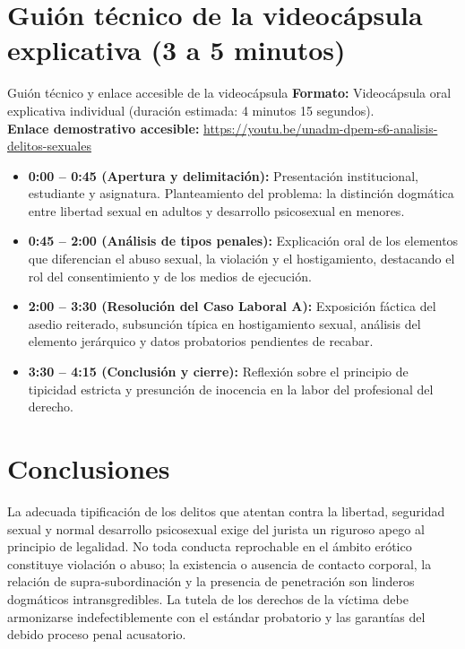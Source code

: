\documentclass[spanish,letterpaper,oneside]{article}
\begin{document}
\section{Guión técnico de la videocápsula explicativa (3 a 5 minutos)}
\begin{casoestudio}{Guión técnico y enlace accesible de la videocápsula}
\textbf{Formato:} Videocápsula oral explicativa individual (duración estimada: 4 minutos 15 segundos). \\
\textbf{Enlace demostrativo accesible:} \url{https://youtu.be/unadm-dpem-s6-analisis-delitos-sexuales}

\begin{itemize}[leftmargin=*,topsep=2pt,itemsep=2pt]
\item \textbf{0:00 -- 0:45 (Apertura y delimitación):} Presentación institucional, estudiante y asignatura. Planteamiento del problema: la distinción dogmática entre libertad sexual en adultos y desarrollo psicosexual en menores.
\item \textbf{0:45 -- 2:00 (Análisis de tipos penales):} Explicación oral de los elementos que diferencian el abuso sexual, la violación y el hostigamiento, destacando el rol del consentimiento y de los medios de ejecución.
\item \textbf{2:00 -- 3:30 (Resolución del Caso Laboral A):} Exposición fáctica del asedio reiterado, subsunción típica en hostigamiento sexual, análisis del elemento jerárquico y datos probatorios pendientes de recabar.
\item \textbf{3:30 -- 4:15 (Conclusión y cierre):} Reflexión sobre el principio de tipicidad estricta y presunción de inocencia en la labor del profesional del derecho.
\end{itemize}
\end{casoestudio}

\section{Conclusiones}
La adecuada tipificación de los delitos que atentan contra la libertad, seguridad sexual y normal desarrollo psicosexual exige del jurista un riguroso apego al principio de legalidad. No toda conducta reprochable en el ámbito erótico constituye violación o abuso; la existencia o ausencia de contacto corporal, la relación de supra-subordinación y la presencia de penetración son linderos dogmáticos intransgredibles. La tutela de los derechos de la víctima debe armonizarse indefectiblemente con el estándar probatorio y las garantías del debido proceso penal acusatorio.
\hypertarget{cuerpo-fin}{}
\end{document}
